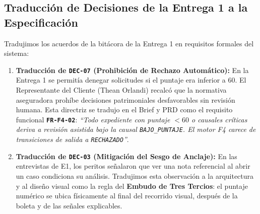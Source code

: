 \documentclass[11pt,letterpaper]{article}
\begin{document}
\subsection{Traducción de Decisiones de la Entrega 1 a la Especificación}
Tradujimos los acuerdos de la bitácora de la Entrega 1 en requisitos formales del sistema:
\begin{enumerate}
    \item \textbf{Traducción de \texttt{DEC-07} (Prohibición de Rechazo Automático):}  
    En la Entrega 1 se permitía denegar solicitudes si el puntaje era inferior a 60. El Representante del Cliente (Thean Orlandi) recalcó que la normativa aseguradora prohíbe decisiones patrimoniales desfavorables sin revisión humana. Esta directriz se tradujo en el Brief y PRD como el requisito funcional \textbf{\texttt{FR-F4-02}}: \textit{``Todo expediente con puntaje $<60$ o causales críticas deriva a revisión asistida bajo la causal \texttt{BAJO\_PUNTAJE}. El motor F4 carece de transiciones de salida a \texttt{RECHAZADO}''}.
    \item \textbf{Traducción de \texttt{DEC-03} (Mitigación del Sesgo de Anclaje):}  
    En las entrevistas de E1, los peritos señalaron que ver una nota referencial al abrir un caso condiciona su análisis. Tradujimos esta observación a la arquitectura y al diseño visual como la regla del \textbf{Embudo de Tres Tercios}: el puntaje numérico se ubica físicamente al final del recorrido visual, después de la boleta y de las señales explicables.
\end{enumerate}
\end{document}
